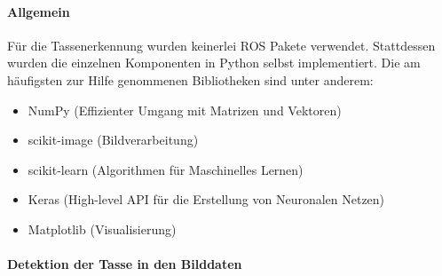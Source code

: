\paragraph{Allgemein}
Für die Tassenerkennung wurden keinerlei ROS Pakete verwendet. Stattdessen wurden die einzelnen Komponenten in Python selbst implementiert. Die am häufigsten zur Hilfe genommenen Bibliotheken sind unter anderem:
\begin{itemize}
\item NumPy (Effizienter Umgang mit Matrizen und Vektoren)
\item scikit-image (Bildverarbeitung)
\item scikit-learn (Algorithmen für Maschinelles Lernen)
\item Keras (High-level API für die Erstellung von Neuronalen Netzen)
\item Matplotlib (Visualisierung)
\end{itemize}

\paragraph{Detektion der Tasse in den Bilddaten}
